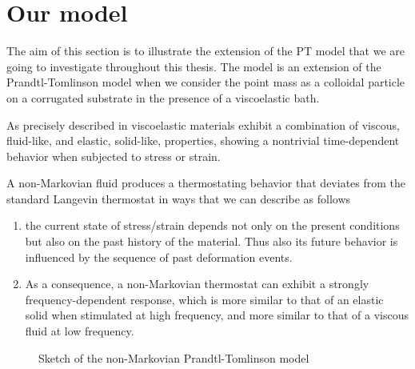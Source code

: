 \section{Our model} \label{ourmodel}
The aim of this section is to illustrate the extension of the PT model that we are going to investigate throughout this thesis. The model is an extension of the Prandtl-Tomlinson model when we consider the point mass as a colloidal particle on a corrugated substrate in the presence of a viscoelastic bath.

As precisely described in \cite{Wineman_2009} viscoelastic materials exhibit a combination of viscous, fluid-like, and elastic, solid-like, properties, showing a nontrivial time-dependent behavior when subjected to stress or strain.

A non-Markovian fluid produces a thermostating behavior that deviates from the standard Langevin thermostat in ways that we can describe as follows \cite{Wineman_2009}
\begin{enumerate}
    \item the current state of stress/strain depends not only on the present conditions but also on the past history of the material. Thus also its future behavior is influenced by the sequence of past deformation events.

    \item As a consequence, a non-Markovian thermostat can exhibit a strongly frequency-dependent response, which is more similar to that of an elastic solid when stimulated at high frequency, and more similar to that of a viscous fluid at low frequency.
\end{enumerate}
\begin{figure}[ht]
    \centering
    \caption{Sketch of the non-Markovian Prandtl-Tomlinson model}
    \label{extendedPT}
\end{figure}
